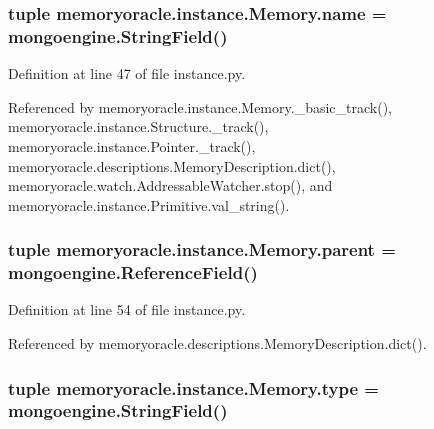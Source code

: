 \subsubsection[{name}]{\setlength{\rightskip}{0pt plus 5cm}tuple memoryoracle.\+instance.\+Memory.\+name = mongoengine.\+String\+Field()\hspace{0.3cm}{\ttfamily [static]}}\label{classmemoryoracle_1_1instance_1_1Memory_a00f51174e05bcbaa2d0ec3faccbaffaa}


Definition at line 47 of file instance.\+py.



Referenced by memoryoracle.\+instance.\+Memory.\+\_\+basic\+\_\+track(), memoryoracle.\+instance.\+Structure.\+\_\+track(), memoryoracle.\+instance.\+Pointer.\+\_\+track(), memoryoracle.\+descriptions.\+Memory\+Description.\+dict(), memoryoracle.\+watch.\+Addressable\+Watcher.\+stop(), and memoryoracle.\+instance.\+Primitive.\+val\+\_\+string().

\hypertarget{classmemoryoracle_1_1instance_1_1Memory_a4f97ee183fd07fc50a47cfef478700d8}{}
\subsubsection[{parent}]{\setlength{\rightskip}{0pt plus 5cm}tuple memoryoracle.\+instance.\+Memory.\+parent = mongoengine.\+Reference\+Field(\textquotesingle{})\hspace{0.3cm}{\ttfamily [static]}}\label{classmemoryoracle_1_1instance_1_1Memory_a4f97ee183fd07fc50a47cfef478700d8}


Definition at line 54 of file instance.\+py.



Referenced by memoryoracle.\+descriptions.\+Memory\+Description.\+dict().

\hypertarget{classmemoryoracle_1_1instance_1_1Memory_a17b9f6c0f548bf201e4fc636c133470b}{}
\subsubsection[{type}]{\setlength{\rightskip}{0pt plus 5cm}tuple memoryoracle.\+instance.\+Memory.\+type = mongoengine.\+String\+Field()\hspace{0.3cm}{\ttfamily [static]}}\label{classmemoryoracle_1_1instance_1_1Memory_a17b9f6c0f548bf201e4fc636c133470b}



